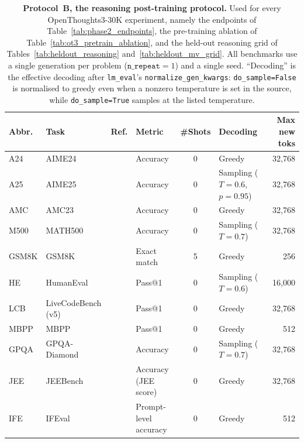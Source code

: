 \begin{table}[htbp]
\centering
\caption{%
\textbf{Protocol~B, the reasoning post-training protocol.} Used for every
OpenThoughts3-30K experiment, namely the endpoints of
Table~\ref{tab:phase2_endpoints}, the pre-training ablation of
Table~\ref{tab:ot3_pretrain_ablation}, and the held-out reasoning grid of
Tables~\ref{tab:heldout_reasoning} and~\ref{tab:heldout_mv_grid}. All benchmarks use a
single generation per problem ($\texttt{n\_repeat}{=}1$) and a single seed. ``Decoding''
is the effective decoding after \texttt{lm\_eval}'s \texttt{normalize\_gen\_kwargs}:
\texttt{do\_sample=False} is normalised to greedy even when a nonzero temperature is set
in the source, while \texttt{do\_sample=True} samples at the listed temperature.%
}
\label{tab:eval-settings-B}
\scriptsize
\setlength{\tabcolsep}{3pt}
\begin{tabularx}{\linewidth}{@{}l l l >{\raggedright\arraybackslash}X c l r@{}}
\toprule
\textbf{Abbr.} & \textbf{Task} & \textbf{Ref.} & \textbf{Metric} & \textbf{\#Shots} & \textbf{Decoding} & \textbf{Max new toks} \\
\midrule
A24   & AIME24             & \citep{aime2024}              & Accuracy               & 0 & Greedy                            & 32{,}768 \\
A25   & AIME25             & \citep{aime2025}              & Accuracy               & 0 & Sampling ($T{=}0.6$, $p{=}0.95$)  & 32{,}768 \\
AMC   & AMC23              & \citep{maa2023amc}            & Accuracy               & 0 & Greedy                            & 32{,}768 \\
M500  & MATH500            & \citep{hendrycks2021math}     & Accuracy               & 0 & Sampling ($T{=}0.7$)              & 32{,}768 \\
GSM8K & GSM8K              & \citep{cobbe2021training}     & Exact match            & 5 & Greedy                            &      256 \\
HE    & HumanEval          & \citep{chen2021evaluating}    & Pass@1                 & 0 & Sampling ($T{=}0.6$)              & 16{,}000 \\
LCB   & LiveCodeBench (v5) & \citep{jain2024livecodebench} & Pass@1                 & 0 & Greedy                            & 32{,}768 \\
MBPP  & MBPP               & \citep{austin2021program}     & Pass@1                 & 0 & Greedy                            &      512 \\
GPQA  & GPQA-Diamond       & \citep{rein2024gpqa}          & Accuracy               & 0 & Sampling ($T{=}0.7$)              & 32{,}768 \\
JEE   & JEEBench           & \citep{arora2023have}         & Accuracy (JEE score)   & 0 & Greedy                            & 32{,}768 \\
IFE   & IFEval             & \citep{zhou2023instruction}   & Prompt-level accuracy  & 0 & Greedy                            &      512 \\
\bottomrule
\end{tabularx}
\end{table}
